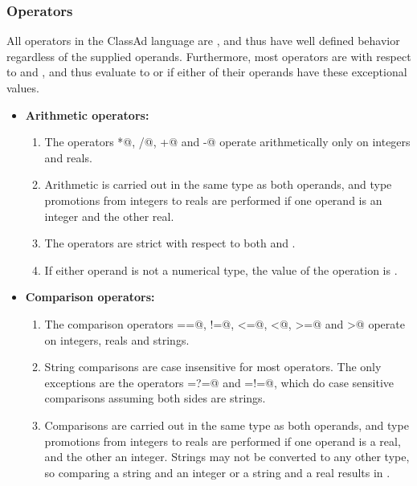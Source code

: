 \subsubsection{Operators}
\label{ClassAd:evaluation-meta}
All operators in the ClassAd language are , and thus have well
defined behavior regardless of the supplied operands.  Furthermore, most
operators are  with respect to  and 
, and thus evaluate to  or 
if either of their operands have these exceptional values.

\begin{itemize}
	\item\textbf{Arithmetic operators:}  
	\begin{enumerate}
		\item The operators \verb@*@, \verb@/@, \verb@+@ and \verb@-@ operate 
		arithmetically only on integers and reals.

		\item Arithmetic is carried out in the same type as both operands,
		and type promotions from integers to reals are performed if one operand 
		is an integer and the other real.

		\item The operators are strict with respect to both  
		and .  

		\item If either operand is not a numerical type, the value of the
		operation is .
	\end{enumerate}

	\item\textbf{Comparison operators:}
	\begin{enumerate}
		\item The comparison operators \verb@==@, \verb@!=@, \verb@<=@, 
		\verb@<@, \verb@>=@ and \verb@>@ operate on integers, reals and strings.

		\item String comparisons are case insensitive for most operators.  The only
		exceptions are the operators \verb@=?=@ and \verb@=!=@, which do case sensitive
		comparisons assuming both sides are strings. 

		\item Comparisons are carried out in the same type as both operands,
		and type promotions from integers to reals are performed if one operand
		is a real, and the other an integer.  Strings may not be converted to
		any other type, so comparing a string and an integer or a
		string and a real results in .


\end{enumerate}
\end{itemize}
